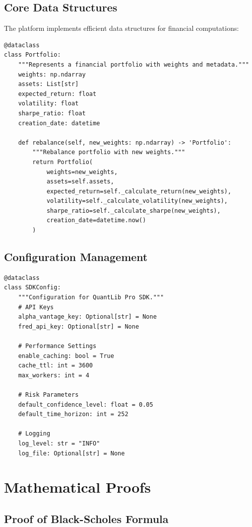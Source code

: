 \documentclass[12pt,a4paper]{article}
\theoremstyle{definition}
\theoremstyle{remark}
\begin{document}
\subsection{Core Data Structures}

The platform implements efficient data structures for financial computations:

\begin{lstlisting}[caption=Portfolio Data Structure]
@dataclass
class Portfolio:
    """Represents a financial portfolio with weights and metadata."""
    weights: np.ndarray
    assets: List[str]
    expected_return: float
    volatility: float
    sharpe_ratio: float
    creation_date: datetime
    
    def rebalance(self, new_weights: np.ndarray) -> 'Portfolio':
        """Rebalance portfolio with new weights."""
        return Portfolio(
            weights=new_weights,
            assets=self.assets,
            expected_return=self._calculate_return(new_weights),
            volatility=self._calculate_volatility(new_weights),
            sharpe_ratio=self._calculate_sharpe(new_weights),
            creation_date=datetime.now()
        )
\end{lstlisting}

\subsection{Configuration Management}

\begin{lstlisting}[caption=SDK Configuration]
@dataclass
class SDKConfig:
    """Configuration for QuantLib Pro SDK."""
    # API Keys
    alpha_vantage_key: Optional[str] = None
    fred_api_key: Optional[str] = None
    
    # Performance Settings
    enable_caching: bool = True
    cache_ttl: int = 3600
    max_workers: int = 4
    
    # Risk Parameters
    default_confidence_level: float = 0.05
    default_time_horizon: int = 252
    
    # Logging
    log_level: str = "INFO"
    log_file: Optional[str] = None
\end{lstlisting}

\section{Mathematical Proofs}

\subsection{Proof of Black-Scholes Formula}
\end{document}
